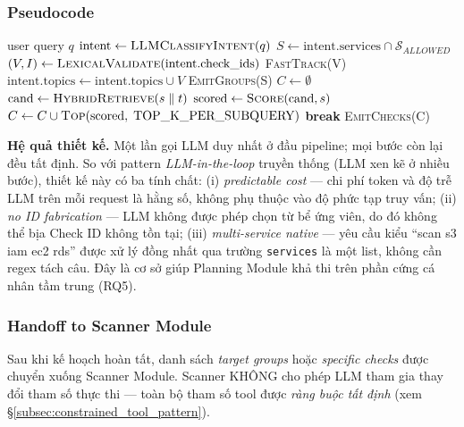 \subsubsection*{Pseudocode}

\begin{algorithmic}[1]
  \Require user query $q$
  \State $\text{intent} \gets \textsc{LLMClassifyIntent}(q)$ 
  \State $S \gets \text{intent.services} \cap \mathcal{S}_{ALLOWED}$
    \State $(V, I) \gets \textsc{LexicalValidate}(\text{intent.check\_ids})$ 
      \State \Return \textsc{FastTrack}(V) 
    \EndIf
    \State $\text{intent.topics} \gets \text{intent.topics} \cup V$ 
  \EndIf
    \State \Return \textsc{EmitGroups}(S) 
  \EndIf
  \State $C \gets \emptyset$ 
    \State $\text{cand} \gets \textsc{HybridRetrieve}(s \;\Vert\; t)$
    \State $\text{scored} \gets \textsc{Score}(\text{cand}, s)$ 
    \State $C \gets C \cup \textsc{Top}(\text{scored},\; \text{TOP\_K\_PER\_SUBQUERY})$
     \State \textbf{break} \EndIf
  \EndFor
  \State \Return \textsc{EmitChecks}(C)
\end{algorithmic}

\textbf{Hệ quả thiết kế.} Một lần gọi LLM duy nhất ở đầu pipeline; mọi bước còn lại đều tất định. So với pattern \textit{LLM-in-the-loop} truyền thống (LLM xen kẽ ở nhiều bước), thiết kế này có ba tính chất: (i) \textit{predictable cost} --- chi phí token và độ trễ LLM trên mỗi request là hằng số, không phụ thuộc vào độ phức tạp truy vấn; (ii) \textit{no ID fabrication} --- LLM không được phép chọn từ bể ứng viên, do đó không thể bịa Check ID không tồn tại; (iii) \textit{multi-service native} --- yêu cầu kiểu ``scan s3 iam ec2 rds'' được xử lý đồng nhất qua trường \texttt{services} là một list, không cần regex tách câu. Đây là cơ sở giúp Planning Module khả thi trên phần cứng cá nhân tầm trung (RQ5).

\subsubsection*{Handoff to Scanner Module}
Sau khi kế hoạch hoàn tất, danh sách \textit{target groups} hoặc \textit{specific checks} được chuyển xuống Scanner Module. Scanner KHÔNG cho phép LLM tham gia thay đổi tham số thực thi — toàn bộ tham số tool được \textit{ràng buộc tất định} (xem \S\ref{subsec:constrained_tool_pattern}).


